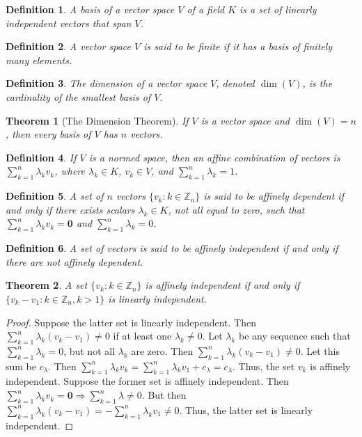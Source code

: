 \documentclass[12pt,oneside]{book}
\theoremstyle{mystyle}
\newtheorem{theorem}{Theorem}[section]
\newtheorem{definition}{Definition}[section]
\begin{document}
\begin{definition}
A basis of a vector space $V$ of a field $K$ is a set of linearly independent vectors that span $V$.
\end{definition}

\begin{definition}
A vector space $V$ is said to be finite if it has a basis of finitely many elements.
\end{definition}

\begin{definition}
The dimension of a vector space $V$, denoted $\dim(V)$, is the cardinality of the smallest basis of $V$.
\end{definition}

\begin{theorem}[The Dimension Theorem]
If $V$ is a vector space and $\dim(V)=n$, then every basis of $V$ has $n$ vectors.
\end{theorem}

\begin{definition}
If $V$ is a normed space, then an affine combination of vectors is $\sum_{k=1}^{n} \lambda_k v_k$, where $\lambda_k \in K$, $v_k \in V$, and $\sum_{k=1}^{n} \lambda_k = 1$.
\end{definition}

\begin{definition}
A set of $n$ vectors $\{v_k:k\in \mathbb{Z}_n\}$ is said to be affinely dependent if and only if there exists scalars $\lambda_k \in K$, not all equal to zero, such that $\sum_{k=1}^{n} \lambda_k v_k = \mathbf{0}$ and $\sum_{k=1}^{n} \lambda_k = 0$.
\end{definition}

\begin{definition}
A set of vectors is said to be affinely independent if and only if there are not affinely dependent.
\end{definition}

\begin{theorem}
A set $\{v_k:k\in \mathbb{Z}_n\}$ is affinely independent if and only if $\{v_k-v_1:k\in \mathbb{Z}_n, k>1\}$ is linearly independent.
\end{theorem}
\begin{proof}
Suppose the latter set is linearly independent. Then $\sum_{k=1}^{n} \lambda_k(v_k-v_1) \ne 0$ if at least one $\lambda_k \ne 0$. Let $\lambda_k$ be any sequence such that $\sum_{k=1}^{n} \lambda_k = 0$, but not all $\lambda_k$ are zero. Then $\sum_{k=1}^{n} \lambda_k(v_k-v_1)\ne 0$. Let this sum be $c_{\lambda}$. Then $\sum_{k=1}^{n} \lambda_k v_k = \sum_{k=1}^{n} \lambda_k v_1 + c_\lambda = c_{\lambda}$. Thus, the set $v_k$ is affinely independent. Suppose the former set is affinely independent. Then $\sum_{k=1}^{n} \lambda_k v_k = \mathbf{0} \Rightarrow \sum_{k=1}^{n} \lambda \ne 0$. But then $\sum_{k=1}^{n}\lambda_k (v_k-v_1) = - \sum_{k=1}^{n} \lambda_k v_1 \ne 0$. Thus, the latter set is linearly independent.
\end{proof}
\end{document}
